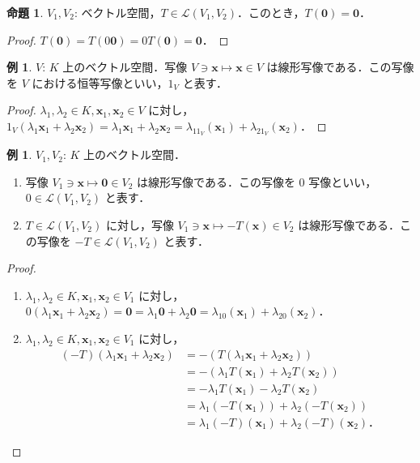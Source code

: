 \documentclass{jlreq}
\theoremstyle{definition}
\newtheorem{prop}[thm]{命題}
\newtheorem{ex}[thm]{例}
\begin{document}
      \begin{prop}
        $V_1, V_2$: ベクトル空間，$T \in \mathcal{L}(V_1, V_2)$．このとき，$T(\bm{0})=\bm{0}$．
      \end{prop}
      \begin{proof}
        $T(\bm{0})=T(0\bm{0})=0T(\bm{0})=\bm{0}$．
      \end{proof}
      \begin{ex}
        $V$: $K$ 上のベクトル空間．写像 $V \ni \bm{x} \mapsto \bm{x} \in V$ は線形写像である．この写像を $V$ における恒等写像といい，$1_V$ と表す．
      \end{ex}
      \begin{proof}
        $\lambda_1,\lambda_2 \in K, \bm{x}_1,\bm{x}_2 \in V$ に対し，$1_V(\lambda_1\bm{x}_1+\lambda_2\bm{x}_2)=\lambda_1\bm{x}_1+\lambda_2\bm{x}_2=\lambda_11_V(\bm{x}_1)+\lambda_21_V(\bm{x}_2)$．
      \end{proof}
      \begin{ex}
        $V_1,V_2$: $K$ 上のベクトル空間．
        \begin{enumerate}
          \item 写像 $V_1 \ni \bm{x} \mapsto \bm{0} \in V_2$ は線形写像である．この写像を $0$ 写像といい，$0 \in \mathcal{L}(V_1,V_2)$ と表す．
          \item $T \in \mathcal{L}(V_1,V_2)$ に対し，写像 $V_1 \ni \bm{x} \mapsto -T(\bm{x}) \in V_2$ は線形写像である．この写像を $-T \in \mathcal{L}(V_1,V_2)$ と表す．
        \end{enumerate}
      \end{ex}
      \begin{proof}
        \mbox{}
        \begin{enumerate}
          \item $\lambda_1,\lambda_2 \in K, \bm{x}_1,\bm{x}_2 \in V_1$ に対し，$0(\lambda_1\bm{x}_1+\lambda_2\bm{x}_2)=\bm{0}=\lambda_1\bm{0}+\lambda_2\bm{0}=\lambda_10(\bm{x}_1)+\lambda_20(\bm{x}_2)$．
          \item $\lambda_1,\lambda_2 \in K, \bm{x}_1,\bm{x}_2 \in V_1$ に対し，
            \begin{align*}
              (-T)(\lambda_1\bm{x}_1+\lambda_2\bm{x}_2) &= -(T(\lambda_1\bm{x}_1+\lambda_2\bm{x}_2)) \\
              &= -(\lambda_1T(\bm{x}_1)+\lambda_2T(\bm{x}_2)) \\
              &= -\lambda_1T(\bm{x}_1)-\lambda_2T(\bm{x}_2) \\
              &= \lambda_1(-T(\bm{x}_1))+\lambda_2(-T(\bm{x}_2)) \\
              &= \lambda_1(-T)(\bm{x}_1)+\lambda_2(-T)(\bm{x}_2)．
            \end{align*}
        \end{enumerate}
      \end{proof}
\end{document}
